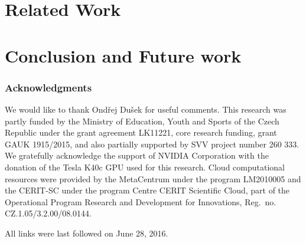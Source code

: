 \documentclass[runningheads,a4paper]{llncs}
\newcommand{\commentontext}[2]{\colorbox{yellow!60}{#1}\pdfcomment[color={0.234 0.867 0.211},hoffset=-6pt,voffset=10pt,opacity=0.5]{#2}}
\begin{document}
\section{Related Work}
\label{sec:related}



\section{Conclusion and Future work}
\label{sec:conc}

\subsubsection*{Acknowledgments}
We would like to thank Ond\v{r}ej Du\v{s}ek for useful comments.
This research was partly funded by the Ministry of Education, Youth and Sports of the Czech Republic under the grant agreement LK11221, core research funding, grant GAUK 1915/2015, and also partially supported by SVV project number 260 333. 
We gratefully acknowledge the support of NVIDIA Corporation with the donation of the Tesla K40c GPU used for this research.
Cloud computational resources were provided by the MetaCentrum under the program LM2010005 and the CERIT-SC under the program Centre CERIT Scientific Cloud, part of the Operational Program Research and Development for Innovations, Reg.\ no. CZ.1.05/3.2.00/08.0144.

%
%
%
%
%
%





All links were last followed on June 28, 2016.
\end{document}
